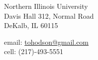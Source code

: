 \begin{cvlist}{}

\item
\begin{minipage}[t]{2.2in}
        Northern Illinois University\\ 
        Davis Hall 312, Normal Road\\
        DeKalb, IL 60115

\end{minipage} \hfill
\begin{minipage}[t]{3in}
        email: \href{mailto:tohodson@gmail.com}{tohodson@gmail.com}\\
        cell: (217)-493-5551
\end{minipage}

\end{cvlist}
